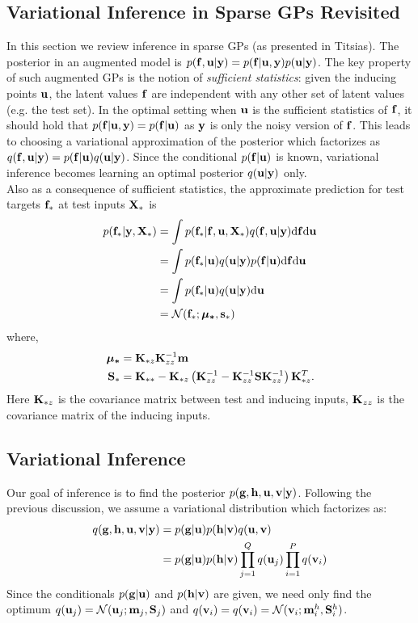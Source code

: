 \subsection{Variational Inference in Sparse GPs Revisited}
In this section we review inference in sparse GPs (as presented in Titsias).
The posterior in an augmented model is $p(\mathbf{f}, \mathbf{u} | \mathbf{y}) = p(\mathbf{f} | \mathbf{u}, \mathbf{y}) p(\mathbf{u} | \mathbf{y})$.
The key property of such augmented GPs  is the notion of \textit{sufficient statistics}: given the inducing points $\mathbf{u}$, the latent values $\mathbf{f}$ are independent with any other set of latent values (e.g. the test set).
In the optimal setting when $\mathbf{u}$ is the sufficient statistics of $\mathbf{f}$, it should hold that $p(\mathbf{f} | \mathbf{u}, \mathbf{y}) = p(\mathbf{f} | \mathbf{u})$ as $\mathbf{y}$ is only the noisy version of $\mathbf{f}$.
This leads to choosing a variational approximation of the posterior which factorizes as $q(\mathbf{f}, \mathbf{u} | \mathbf{y}) = p(\mathbf{f} | \mathbf{u}) q(\mathbf{u} | \mathbf{y})$.
Since the conditional $p(\mathbf{f} | \mathbf{u})$ is known, variational inference becomes learning an optimal posterior $q(\mathbf{u} | \mathbf{y})$ only. \\

\noindent Also as a consequence of sufficient statistics, the approximate prediction for test targets $\mathbf{f}_*$ at test inputs $\mathbf{X}_*$ is
\begin{align}
\nonumber
p(\mathbf{f}_* | \mathbf{y}, \mathbf{X}_*) &= \int p(\mathbf{f}_* | \mathbf{f}, \mathbf{u}, \mathbf{X}_*) q(\mathbf{f}, \mathbf{u} | \mathbf{y}) \mathrm{d} \mathbf{f} \mathrm{d} \mathbf{u} \\
\nonumber
&= \int p(\mathbf{f}_* | \mathbf{u}) q(\mathbf{u}| \mathbf{y}) p(\mathbf{f} | \mathbf{u}) \mathrm{d} \mathbf{f} \mathrm{d} \mathbf{u} \\ \nonumber
&= \int p(\mathbf{f}_* | \mathbf{u}) q(\mathbf{u}| \mathbf{y}) \mathrm{d} \mathbf{u} \\
\label{eq:sorprediction}
&= \mathcal{N}(\mathbf{f}_*; \boldsymbol{\mu_*},\mathbf{s_*})
\end{align}
where,
\begin{align}
\nonumber
\boldsymbol{\mu_*} &= \mathbf{K}_{*z} \mathbf{K}_{zz}^{-1}\mathbf{m} \\ 
\nonumber
\mathbf{S}_* &= \mathbf{K}_{**} - \mathbf{K}_{*z} \left(\mathbf{K}_{zz}^{-1} - \mathbf{K}_{zz}^{-1} \mathbf{S} \mathbf{K}_{zz}^{-1} \right) \mathbf{K}_{*z}^T.
\end{align}
 Here $\mathbf{K}_{*z}$ is the covariance matrix between test and inducing inputs, $\mathbf{K}_{zz}$ is the covariance matrix of the inducing inputs.

\subsection{Variational Inference}
\newcommand{\ug}{\u_g}
\newcommand{\uh}{\u^h}
\newcommand{\mgj}{\m_j}
\newcommand{\mhi}{\m^h_i}
\newcommand{\Sgj}{\S_j}
\newcommand{\Shi}{\S^h_i}
Our goal of inference is to find the posterior $p(\mathbf{g}, \mathbf{h}, \mathbf{u}, \mathbf{v} | \mathbf{y})$. 
Following the previous discussion, we assume a variational distribution which factorizes as:
\begin{align}
\nonumber
q(\mathbf{g}, \mathbf{h}, \mathbf{u}, \mathbf{v} | \mathbf{y})
\nonumber
 &= p(\mathbf{g}|\mathbf{u}) p(\mathbf{h}|\mathbf{v}) q(\mathbf{u},\mathbf{v})  \\
 &= p(\mathbf{g}|\mathbf{u}) p(\mathbf{h}|\mathbf{v}) \prod_{j=1}^Q q(\mathbf{u}_j) \prod_{i=1}^P  q(\mathbf{v}_i)
\end{align}
Since the conditionals $p(\mathbf{g} | \mathbf{u})$ and $p(\mathbf{h} | \mathbf{v})$ are given, we need only  find the optimum $q(\u_j) = \Normal(\u_j; \mgj, \Sgj)$ and $q(\v_i) = q(\v_i) = \Normal(\v_i; \mhi, \Shi)$.

